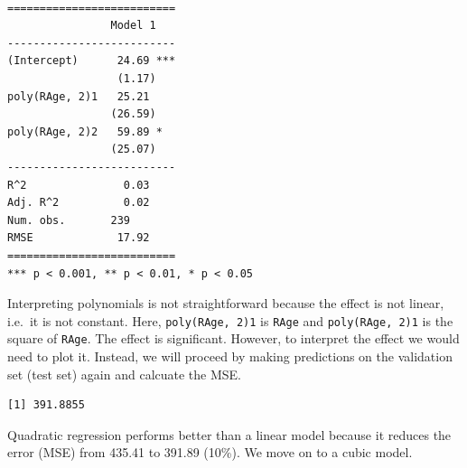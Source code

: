 \documentclass[]{article}
\newenvironment{Shaded}{\begin{snugshade}}{\end{snugshade}}
\newcommand{\CommentTok}[1]{\textcolor[rgb]{0.56,0.35,0.01}{\textit{#1}}}
\newcommand{\DataTypeTok}[1]{\textcolor[rgb]{0.13,0.29,0.53}{#1}}
\newcommand{\DecValTok}[1]{\textcolor[rgb]{0.00,0.00,0.81}{#1}}
\newcommand{\KeywordTok}[1]{\textcolor[rgb]{0.13,0.29,0.53}{\textbf{#1}}}
\newcommand{\NormalTok}[1]{#1}
\newcommand{\OperatorTok}[1]{\textcolor[rgb]{0.81,0.36,0.00}{\textbf{#1}}}
\newcommand{\StringTok}[1]{\textcolor[rgb]{0.31,0.60,0.02}{#1}}
\begin{document}
\begin{verbatim}

==========================
                Model 1   
--------------------------
(Intercept)      24.69 ***
                 (1.17)   
poly(RAge, 2)1   25.21    
                (26.59)   
poly(RAge, 2)2   59.89 *  
                (25.07)   
--------------------------
R^2               0.03    
Adj. R^2          0.02    
Num. obs.       239       
RMSE             17.92    
==========================
*** p < 0.001, ** p < 0.01, * p < 0.05
\end{verbatim}

Interpreting polynomials is not straightforward because the effect is not linear, i.e.~it is not constant. Here, \texttt{poly(RAge,\ 2)1} is \texttt{RAge} and \texttt{poly(RAge,\ 2)1} is the square of \texttt{RAge}. The effect is significant. However, to interpret the effect we would need to plot it. Instead, we will proceed by making predictions on the validation set (test set) again and calcuate the MSE.

\begin{Shaded}
\end{Shaded}

\begin{verbatim}
[1] 391.8855
\end{verbatim}

Quadratic regression performs better than a linear model because it reduces the error (MSE) from 435.41 to 391.89 (10\%). We move on to a cubic model.

\begin{Shaded}
\end{Shaded}
\end{document}
